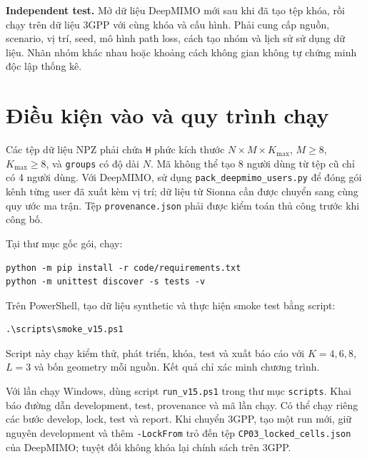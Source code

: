 \documentclass[11pt,onecolumn]{IEEEtran}
\begin{document}
\textbf{Independent test.} Mở dữ liệu DeepMIMO mới sau khi đã tạo tệp khóa, rồi chạy trên dữ liệu 3GPP với cùng khóa và cấu hình. Phải cung cấp nguồn, scenario, vị trí, seed, mô hình path loss, cách tạo nhóm và lịch sử sử dụng dữ liệu. Nhãn nhóm khác nhau hoặc khoảng cách không gian không tự chứng minh độc lập thống kê.

\section{Điều kiện vào và quy trình chạy}
Các tệp dữ liệu NPZ phải chứa \texttt{H} phức kích thước $N\times M\times K_{\max}$, $M\ge8$, $K_{\max}\ge8$, và \texttt{groups} có độ dài $N$. Mã không thể tạo 8 người dùng từ tệp cũ chỉ có 4 người dùng. Với DeepMIMO, sử dụng \texttt{pack\_deepmimo\_users.py} để đóng gói kênh từng user đã xuất kèm vị trí; dữ liệu từ Sionna cần được chuyển sang cùng quy ước ma trận. Tệp \texttt{provenance.json} phải được kiểm toán thủ công trước khi công bố.

Tại thư mục gốc gói, chạy:
\begin{verbatim}
python -m pip install -r code/requirements.txt
python -m unittest discover -s tests -v
\end{verbatim}
Trên PowerShell, tạo dữ liệu synthetic và thực hiện smoke test bằng script:
\begin{verbatim}
.\scripts\smoke_v15.ps1
\end{verbatim}
Script này chạy kiểm thử, phát triển, khóa, test và xuất báo cáo với $K=4,6,8$, $L=3$ và bốn geometry mỗi nguồn. Kết quả chỉ xác minh chương trình.

Với lần chạy Windows, dùng script \texttt{run\_v15.ps1} trong thư mục \texttt{scripts}. Khai báo đường dẫn development, test, provenance và mã lần chạy. Có thể chạy riêng các bước develop, lock, test và report. Khi chuyển 3GPP, tạo một run mới, giữ nguyên development và thêm \texttt{-LockFrom} trỏ đến tệp \texttt{CP03\_locked\_cells.json} của DeepMIMO; tuyệt đối không khóa lại chính sách trên 3GPP.
\end{document}
